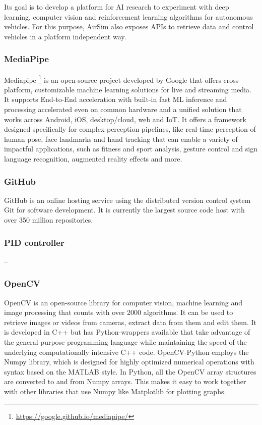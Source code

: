 Its goal is to develop a platform for AI research to experiment with deep learning, computer vision and reinforcement learning algorithms for autonomous vehicles. For this purpose, AirSim also exposes APIs to retrieve data and control vehicles in a platform independent way.

\subsubsection{MediaPipe}
\label{subsec:mediapipe}
Mediapipe \footnote{\url{https://google.github.io/mediapipe/}} is an open-source project developed by Google that offers cross-platform, customizable machine learning solutions for live and streaming media.
It supports End-to-End acceleration with built-in fast ML inference and processing accelerated even on common hardware and a unified solution that works across Android, iOS, desktop/cloud, web and IoT.
It offers a framework designed specifically for complex perception pipelines, like real-time perception of human pose, face landmarks and hand tracking that can enable a variety of impactful applications, such as fitness and sport analysis, gesture control and sign language recognition, augmented reality effects and more.


\subsubsection{GitHub}
\label{subsec:github}
GitHub is an online hosting service using the distributed version control system Git for software development. It is currently the largest source code host with over 350 million repositories.


\subsubsection{PID controller}
\label{subsec:pid-theory}
--


\subsubsection{OpenCV}
\label{subsec:opencv}
OpenCV is an open-source library for computer vision, machine learning and image processing that counts with over 2000 algorithms. 
It can be used to retrieve images or videos from cameras, extract data from them and edit them.
It is developed in C++ but has Python-wrappers available that take advantage of the general purpose programming language while maintaining the speed of the underlying computationally intensive C++ code.
OpenCV-Python employs the Numpy library, which is designed for highly optimized numerical operations with syntax based on the MATLAB style.
In Python, all the OpenCV array structures are converted to and from Numpy arrays. 
This makes it easy to work together with other libraries that use Numpy like Matplotlib for plotting graphs.


